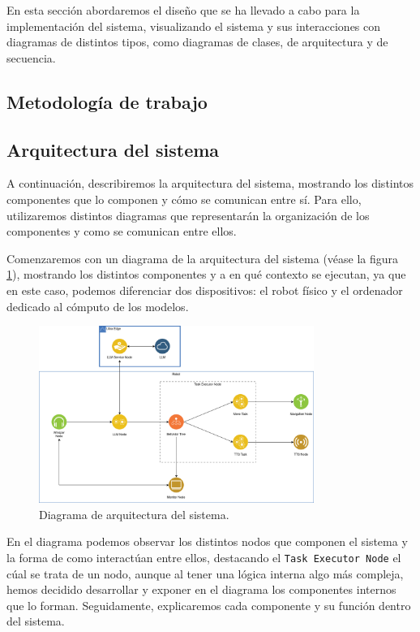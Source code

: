 \documentclass[../main.tex]{subfiles}
\begin{document}
En esta sección abordaremos el diseño que se ha llevado a cabo para la implementación del sistema, visualizando el sistema y sus interacciones con diagramas de distintos tipos, como diagramas
de clases, de arquitectura y de secuencia. 

\subsection{Metodología de trabajo}

\subsection{Arquitectura del sistema}
A continuación, describiremos la arquitectura del sistema, mostrando los distintos componentes que lo componen y cómo se comunican entre sí. Para ello, utilizaremos distintos diagramas que representarán la organización de los componentes y como se comunican entre ellos. 

Comenzaremos con un diagrama de la arquitectura del sistema (véase la figura \ref{fig:diseno_architecture}), mostrando los distintos componentes y a en qué contexto se ejecutan, ya que en este caso, podemos diferenciar dos dispositivos: el robot físico y el ordenador dedicado al cómputo de los modelos.

\begin{figure}[H]
    \centering
    \includegraphics[width=0.8\textwidth]{images/diseno_architecture.png}
    \caption{Diagrama de arquitectura del sistema.}\label{fig:diseno_architecture}
\end{figure}

En el diagrama podemos observar los distintos nodos que componen el sistema y la forma de como interactúan entre ellos, destacando el \texttt{Task Executor Node} el cúal se trata de un nodo, aunque al tener una lógica interna algo más compleja, hemos decidido desarrollar y exponer en el diagrama los
componentes internos que lo forman. Seguidamente, explicaremos cada componente y su función dentro del sistema.
\end{document}
